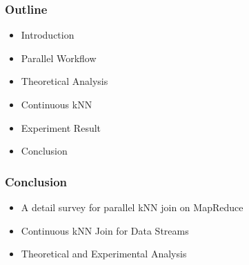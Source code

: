 \begin{frame}
\frametitle{Outline}
	\begin{itemize}
		\item Introduction
		\item Parallel Workflow
		\item Theoretical Analysis
		\item Continuous kNN
		\item Experiment Result
		\item Conclusion
	\end{itemize}
\end{frame}

\begin{frame}
\frametitle{Conclusion}
\begin{itemize}

\item A detail survey for parallel kNN join on MapReduce

\item Continuous kNN Join for Data Streams

\item Theoretical and Experimental Analysis

\end{itemize}

\end{frame}


